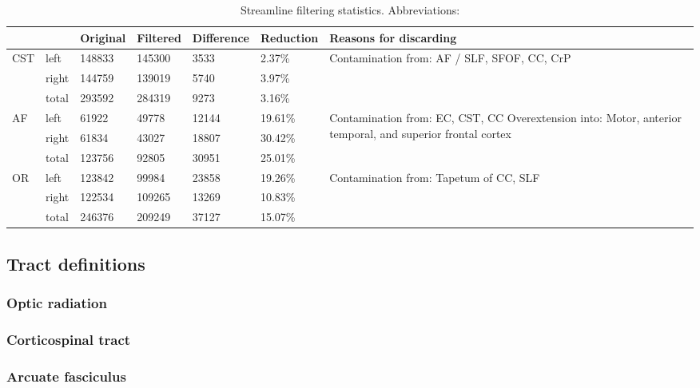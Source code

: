\begin{table*}[t]
  \caption{Streamline filtering statistics. Abbreviations: }
  \label{tab:filt}
  \small
  \begin{tabularx}{\textwidth}{llllll X}\toprule
   &  & Original & Filtered & Difference & Reduction & Reasons for discarding \\
   \midrule
  CST & left & 148833 & 145300 & 3533 & 2.37\% & \multirow{3}{=}{Contamination from: AF / SLF, SFOF, CC, CrP} \\
   & right & 144759 & 139019 & 5740 & 3.97\% &  \\
   & total & 293592 & 284319 & 9273 & 3.16\% &  \\ \addlinespace
  AF & left & 61922 & 49778 & 12144 & 19.61\% & \multirow{3}{=}{Contamination from:  EC, CST, CC Overextension into: Motor, anterior temporal, and superior frontal cortex} \\
   & right & 61834 & 43027 & 18807 & 30.42\% &  \\
   & total & 123756 & 92805 & 30951 & 25.01\% &  \\ \addlinespace
  OR & left & 123842 & 99984 & 23858 & 19.26\% & \multirow{3}{=}{Contamination from: Tapetum of CC, SLF} \\
   & right & 122534 & 109265 & 13269 & 10.83\% &  \\
   & total & 246376 & 209249 & 37127 & 15.07\% & \\ \toprule
 \end{tabularx}
\end{table*}


\subsection{Tract definitions}

\subsubsection{Optic radiation}

\subsubsection{Corticospinal tract}

\subsubsection{Arcuate fasciculus}

